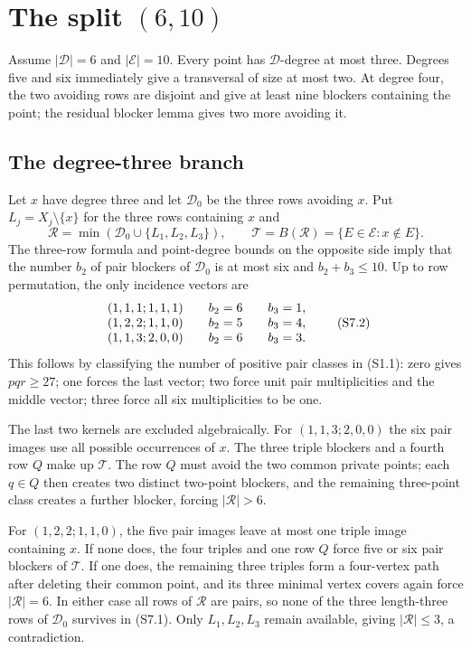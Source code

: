 \documentclass[11pt,a4paper]{article}
\theoremstyle{definition}
\newcommand{\blocker}{B}
\newcommand{\minrows}{\operatorname{min}}
\begin{document}
\section{The split \texorpdfstring{$(6,10)$}{(6,10)}}
\label{sec:six-ten}

Assume $|\mathcal D|=6$ and $|\mathcal E|=10$.  Every point has
$\mathcal D$-degree at most three.  Degrees five and six immediately give a
transversal of size at most two.  At degree four, the two avoiding rows are
disjoint and give at least nine blockers containing the point; the residual
blocker lemma gives two more avoiding it.

\subsection{The degree-three branch}

Let $x$ have degree three and let $\mathcal D_0$ be the three rows avoiding
$x$.  Put $L_j=X_j\setminus\{x\}$ for the three rows containing $x$ and
\[
 \mathcal R=\minrows(\mathcal D_0\cup\{L_1,L_2,L_3\}),
 \qquad
 \mathcal T=\blocker(\mathcal R)
 =\{E\in\mathcal E:x\notin E\}.          \tag{S7.1}
\]
The three-row formula and point-degree bounds on the opposite side imply
that the number $b_2$ of pair blockers of $\mathcal D_0$ is at most six and
$b_2+b_3\leq10$.  Up to row permutation, the only incidence vectors are
\[
\begin{array}{c@{\qquad}c@{\qquad}c}
(1,1,1;1,1,1)&b_2=6&b_3=1,\\
(1,2,2;1,1,0)&b_2=5&b_3=4,\\
(1,1,3;2,0,0)&b_2=6&b_3=3.
\end{array}                                                   \tag{S7.2}
\]
This follows by classifying the number of positive pair classes in
(S1.1): zero gives $pqr\geq27$; one forces the last vector; two force unit
pair multiplicities and the middle vector; three force all six
multiplicities to be one.

The last two kernels are excluded algebraically.  For
$(1,1,3;2,0,0)$ the six pair images use all possible occurrences of $x$.
The three triple blockers and a fourth row $Q$ make up $\mathcal T$.
The row $Q$ must avoid the two common private points; each $q\in Q$ then
creates two distinct two-point blockers, and the remaining three-point class
creates a further blocker, forcing $|\mathcal R|>6$.

For $(1,2,2;1,1,0)$, the five pair images leave at most one triple image
containing $x$.  If none does, the four triples and one row $Q$ force five or
six pair blockers of $\mathcal T$.  If one does, the remaining three triples
form a four-vertex path after deleting their common point, and its three
minimal vertex covers again force $|\mathcal R|=6$.  In either case all rows
of $\mathcal R$ are pairs, so none of the three length-three rows of
$\mathcal D_0$ survives in (S7.1).  Only $L_1,L_2,L_3$ remain available,
giving $|\mathcal R|\leq3$, a contradiction.
\end{document}

